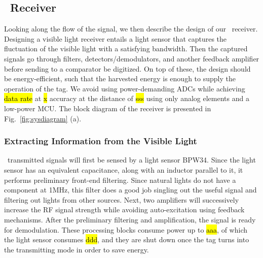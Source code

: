 \subsection{\vitag\ Receiver}
Looking along the flow of the signal, we then describe the design of our \vitag\ receiver. Designing a visible light receiver entails a light sensor that captures the fluctuation of the visible light with a satisfying bandwidth. Then the captured signals go through filters, detectors/demodulators, and another feedback amplifier before sending to a comparator be digitized. On top of these, the design should be energy-efficient, such that the harvested energy is enough to supply the operation of the tag. We avoid using power-demanding ADCs while achieving \hl{data rate} at \hl{x} accuracy at the distance of \hl{sss} using only analog elements and a low-power MCU. The block diagram of the receiver is presented in Fig.~\ref{fig:sysdiagram} (a).

\subsubsection{Extracting Information from the Visible Light}
\reader\ transmitted signals will first be sensed by a light sensor BPW34. Since the light sensor has an equivalent capacitance, along with an inductor parallel to it, it performs preliminary front-end filtering. Since natural lights do not have a component at 1MHz, this filter does a good job singling out the useful signal and filtering out lights from other sources. Next, two amplifiers will successively increase the RF signal strength while avoiding auto-excitation using feedback mechanisms. After the preliminary filtering and amplification, the signal is ready for demodulation. These processing blocks consume power up to \hl{aaa}, of which the light sensor consumes \hl{ddd}, and they are shut down once the tag turns into the transmitting mode in order to save energy.


